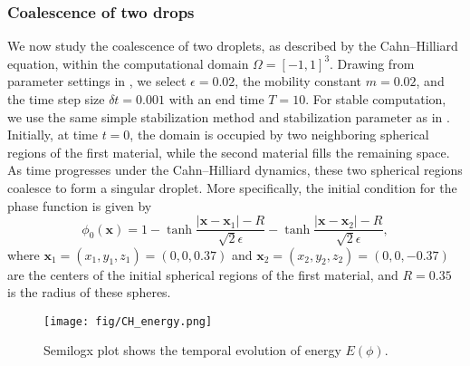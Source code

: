 \documentclass{article}
\newcommand{\bx}{\bm{x}}
\begin{document}
\subsubsection{Coalescence of two drops}
We now study the coalescence of two droplets, as described by the Cahn--Hilliard equation, within the computational domain $\Omega=[-1,1]^3$.  Drawing from parameter settings in \cite{ChenShen2012}, we select $\epsilon=0.02$, the mobility constant $m=0.02$, and the time step size $\delta t = 0.001$ with an end time $T = 10$. For stable computation, we use the same simple stabilization method and stabilization parameter as in \cite{ChenShen2012}.
Initially, at time $t=0$, the domain is occupied by two neighboring spherical regions of the first material, while the second material fills the remaining space. As time progresses under the Cahn--Hilliard dynamics, these two spherical regions coalesce to form a singular droplet. More specifically, the initial condition for the phase function is given by
\begin{equation}
    \phi_{0}(\bx) = 1 - \tanh\frac{\vert \bx - \bx_1\vert - R}{\sqrt{2}\epsilon}  - \tanh\frac{\vert \bx - \bx_2\vert - R}{\sqrt{2}\epsilon},
\end{equation}
where $\bx_1 = (x_1,y_1,z_1) = (0,0,0.37)$ and $\bx_2 = (x_2,y_2,z_2) = (0,0,-0.37)$ are the centers of the initial spherical regions of the first material, and $R=0.35$ is the radius of these spheres.
\begin{figure}[ht!]
    \centering
    \texttt{[image: fig/CH\_energy.png]}
    \caption{Semilogx plot shows the temporal evolution of energy $E(\phi)$.}
    \label{fig2:CH_energy}
\end{figure}
\end{document}
